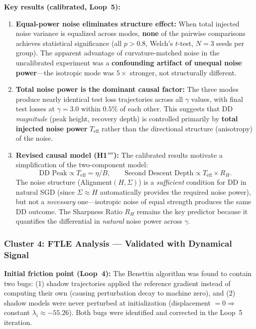 \documentclass[
  journal=largetwo,
  simfonts=false,
  year=2025,
  volume=37,
]{cup-journal}
\begin{document}
\textbf{Key results (calibrated, Loop~5):}
\begin{enumerate}
    \item \textbf{Equal-power noise eliminates structure effect:} When total injected noise variance is equalized across modes, \textbf{none} of the pairwise comparisons achieves statistical significance (all $p > 0.8$, Welch's $t$-test, $N=3$ seeds per group). The apparent advantage of curvature-matched noise in the uncalibrated experiment was a \textbf{confounding artifact of unequal noise power}---the isotropic mode was $5\times$ stronger, not structurally different.
    
    \item \textbf{Total noise power is the dominant causal factor:} The three modes produce nearly identical test loss trajectories across all $\gamma$ values, with final test losses at $\gamma=3.0$ within $0.5\%$ of each other. This suggests that DD \emph{magnitude} (peak height, recovery depth) is controlled primarily by \textbf{total injected noise power} $T_{\mathrm{eff}}$ rather than the directional structure (anisotropy) of the noise.
    
    \item \textbf{Revised causal model (H1$''''$):} The calibrated results motivate a simplification of the two-component model:
    \begin{equation}\label{eq:one_component_causal}
        \text{DD Peak} \propto T_{\mathrm{eff}} = \eta/B, \qquad
        \text{Second Descent Depth} \propto T_{\mathrm{eff}} \times R_H.
    \end{equation}
    The noise structure (Alignment$(H,\Sigma)$) is a \emph{sufficient} condition for DD in natural SGD (since $\Sigma \approx H$ automatically provides the required noise power), but not a \emph{necessary} one---isotropic noise of equal strength produces the same DD outcome. The Sharpness Ratio $R_H$ remains the key predictor because it quantifies the differential in \emph{natural} noise power across $\gamma$.
\end{enumerate}

\subsubsection{Cluster 4: FTLE Analysis --- Validated with Dynamical Signal}

\textbf{Initial friction point (Loop~4):} The Benettin algorithm was found to contain two bugs: (1) shadow trajectories applied the reference gradient instead of computing their own (causing perturbation decay to machine zero), and (2) shadow models were never perturbed at initialization (displacement $= 0 \Rightarrow$ constant $\lambda_i \approx -55.26$). Both bugs were identified and corrected in the Loop~5 iteration.
\end{document}
